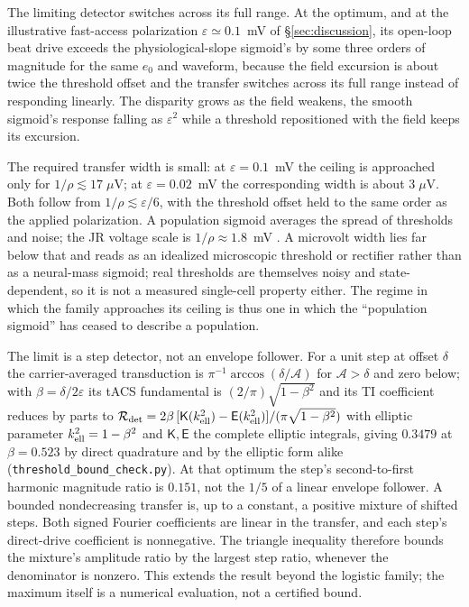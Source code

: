 \documentclass[11pt,a4paper]{article}
\providecommand{\DIFaddtex}[1]{{\protect\color{blue} \sf #1}} %
\providecommand{\DIFadd}[1]{\texorpdfstring{\DIFaddtex{#1}}{#1}} %
\begin{document}
\DIFadd{The limiting detector switches across its full range. At the optimum,
and at the illustrative fast-access polarization $\varepsilon\!\simeq\!0.1$~mV
of \S\ref{sec:discussion}, its open-loop beat drive
exceeds the physiological-slope sigmoid's by some three orders of magnitude for the same
$e_0$ and waveform, because the field excursion is about twice the threshold offset and the
transfer switches across its full range instead of responding linearly. The disparity grows
as the field weakens, the smooth sigmoid's response falling as $\varepsilon^2$ while a
threshold repositioned with the field keeps its excursion.
}

\DIFadd{The required transfer width is small: at $\varepsilon=0.1$~mV the ceiling is approached only for
$1/\rho\lesssim17\;\mu$V; at $\varepsilon=0.02$~mV the corresponding width is
about $3\;\mu$V. Both follow from $1/\rho\lesssim\varepsilon/6$, with the
threshold offset held to the same order as the applied polarization. A population
sigmoid averages the spread of thresholds and noise; the JR voltage scale is
$1/\rho\approx1.8$~mV \cite{jansen1995}. A
microvolt width lies far below that and reads as an idealized microscopic threshold or
rectifier rather than as a neural-mass sigmoid; real thresholds are themselves noisy and
state-dependent, so it is not a measured single-cell property either. The
regime in which the family approaches its ceiling is thus one in which the ``population
sigmoid'' has ceased to describe a population.
}

\DIFadd{The limit is a step detector, not an envelope follower. For a unit step at offset
$\delta$ the carrier-averaged transduction is $\pi^{-1}\arccos(\delta/\mathcal A)$ for $\mathcal A>\delta$
and zero below; with $\beta=\delta/2\varepsilon$ its tACS fundamental is
$(2/\pi)\sqrt{1-\beta^2}$ and its TI coefficient reduces by parts to
$\mathcal R_{\rm det}=2\beta\,[\mathsf K(k_{\rm ell}^2)-\mathsf E(k_{\rm ell}^2)]/(\pi\sqrt{1-\beta^2})$
with elliptic parameter $k_{\rm ell}^2=1-\beta^2$ and $\mathsf K,\mathsf E$
the complete elliptic integrals, giving $0.3479$ at $\beta=0.523$ by direct quadrature and
by the elliptic form alike (\texttt{threshold\_bound\_check.py}). At that optimum the
step's second-to-first harmonic magnitude ratio is $0.151$, not the $1/5$ of a linear
envelope follower. A bounded nondecreasing transfer is, up to a constant, a positive
mixture of shifted steps. Both signed Fourier coefficients are linear in the
transfer, and each step's direct-drive coefficient is nonnegative. The triangle
inequality therefore bounds the mixture's amplitude ratio by the largest step
ratio, whenever the denominator is nonzero. This extends the result beyond the
logistic family; the maximum itself is a numerical evaluation, not a certified bound.
}
\end{document}

